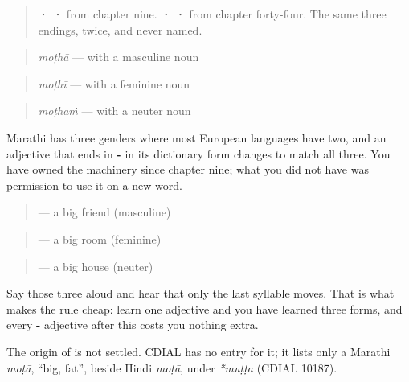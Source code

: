 \label{lesson:MR-C49-adj-agreement}



\begin{quote}
\textbf{ ·  · } from chapter nine. \textbf{ ·  · } from chapter forty-four. The same three endings, twice, and never named.
\end{quote}

\begin{grammarlens}[title={Grammar Lens: the adjective takes the gender of its noun}]
\begin{quote}
\textbf{} \emph{moṭhā} — with a masculine noun
\end{quote}

\begin{quote}
\textbf{} \emph{moṭhī} — with a feminine noun
\end{quote}

\begin{quote}
\textbf{} \emph{moṭhaṁ} — with a neuter noun
\end{quote}

Marathi has three genders where most European languages have two, and an adjective that ends in \textbf{-} in its dictionary form changes to match all three. You have owned the machinery since chapter nine; what you did not have was permission to use it on a new word.

\begin{quote}
\textbf{ } — a big friend (masculine)
\end{quote}

\begin{quote}
\textbf{ } — a big room (feminine)
\end{quote}

\begin{quote}
\textbf{ } — a big house (neuter)
\end{quote}

Say those three aloud and hear that only the last syllable moves. That is what makes the rule cheap: learn one adjective and you have learned three forms, and every \textbf{-} adjective after this costs you nothing extra.
\end{grammarlens}

\begin{cousinweb}
The origin of \textbf{} is not settled. CDIAL has no entry for it; it lists only a Marathi \emph{moṭā}, \textquotedblleft{}big, fat\textquotedblright{}, beside Hindi \emph{moṭā}, under \emph{*muṭṭa} (CDIAL 10187).
\end{cousinweb}

